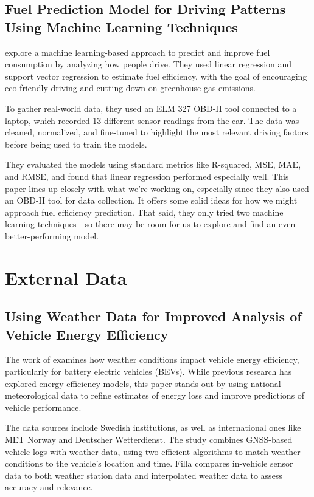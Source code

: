\documentclass[letterpaper]{article}
\begin{document}
\subsection*{Fuel Prediction Model for Driving Patterns Using Machine Learning
Techniques}

\cite{Manjunath2024} explore a machine learning-based approach to predict and improve
fuel consumption by analyzing how people drive. They used linear regression and
support vector regression to estimate fuel efficiency, with the goal of
encouraging eco-friendly driving and cutting down on greenhouse gas emissions.

To gather real-world data, they used an ELM 327 OBD-II tool connected to a
laptop, which recorded 13 different sensor readings from the car. The data was
cleaned, normalized, and fine-tuned to highlight the most relevant driving
factors before being used to train the models. 

They evaluated the models using
standard metrics like R-squared, MSE, MAE, and RMSE, and found that linear
regression performed especially well. This paper lines up closely with what
we're working on, especially since they also used an OBD-II tool for data
collection. It offers some solid ideas for how we might approach fuel efficiency
prediction. That said, they only tried two machine learning techniques---so
there may be room for us to explore and find an even better-performing model.

\section*{External Data}

\subsection*{Using Weather Data for Improved Analysis of Vehicle Energy
Efficiency}

The work of \cite{filla2025using} examines how weather conditions impact vehicle energy
efficiency, particularly for battery electric vehicles (BEVs). While previous
research has explored energy efficiency models, this paper stands out by using
national meteorological data to refine estimates of energy loss and improve
predictions of vehicle performance. 

The data sources include Swedish
institutions, as well as international ones like MET Norway and Deutscher
Wetterdienst. The study combines GNSS-based vehicle logs with weather data,
using two efficient algorithms to match weather conditions to the vehicle's
location and time. Filla compares in-vehicle sensor data to both weather station
data and interpolated weather data to assess accuracy and relevance. 
\end{document}
